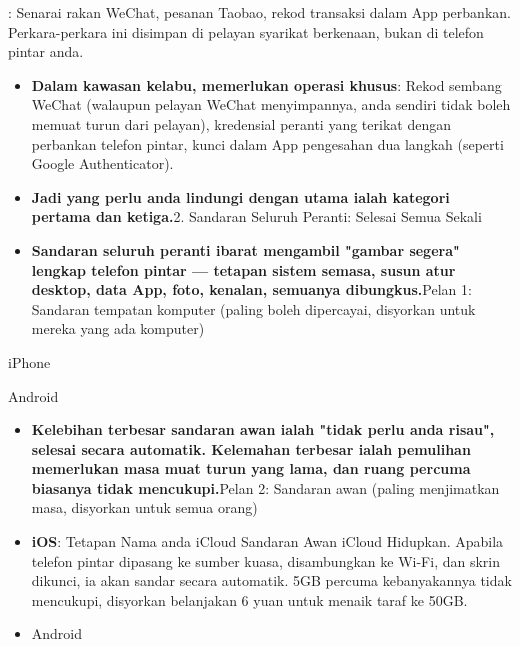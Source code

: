 


: Senarai rakan WeChat, pesanan Taobao, rekod transaksi dalam App perbankan. Perkara-perkara ini disimpan di pelayan syarikat berkenaan, bukan di telefon pintar anda.

\begin{itemize}
  \item \textbf{Dalam kawasan kelabu, memerlukan operasi khusus}: Rekod sembang WeChat (walaupun pelayan WeChat menyimpannya, anda sendiri tidak boleh memuat turun dari pelayan), kredensial peranti yang terikat dengan perbankan telefon pintar, kunci dalam App pengesahan dua langkah (seperti Google Authenticator).
  \item \textbf{Jadi yang perlu anda lindungi dengan utama ialah kategori pertama dan ketiga.}2. Sandaran Seluruh Peranti: Selesai Semua Sekali
  \item \textbf{Sandaran seluruh peranti ibarat mengambil "gambar segera" lengkap telefon pintar — tetapan sistem semasa, susun atur desktop, data App, foto, kenalan, semuanya dibungkus.}Pelan 1: Sandaran tempatan komputer (paling boleh dipercayai, disyorkan untuk mereka yang ada komputer)
\end{itemize}

iPhone


Android


\begin{itemize}
  \item \textbf{Kelebihan terbesar sandaran awan ialah "tidak perlu anda risau", selesai secara automatik. Kelemahan terbesar ialah pemulihan memerlukan masa muat turun yang lama, dan ruang percuma biasanya tidak mencukupi.}Pelan 2: Sandaran awan (paling menjimatkan masa, disyorkan untuk semua orang)
  \item \textbf{iOS}: Tetapan Nama anda iCloud Sandaran Awan iCloud Hidupkan. Apabila telefon pintar dipasang ke sumber kuasa, disambungkan ke Wi-Fi, dan skrin dikunci, ia akan sandar secara automatik. 5GB percuma kebanyakannya tidak mencukupi, disyorkan belanjakan 6 yuan untuk menaik taraf ke 50GB.
  \item Android
\end{itemize}

